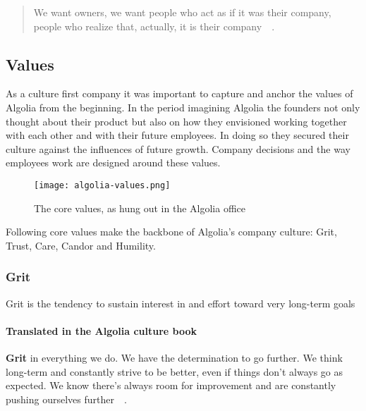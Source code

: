 \begin{quote}
We want owners, we want people who act as if it was their company, people who realize that, actually, it is their company~\cite{culture-first}~.
\end{quote}

\subsection{Values}
\label{sub:values}

As a culture first company it was important to capture and anchor the values of Algolia from the beginning. In the period imagining Algolia the founders not only thought about their product but also on how they envisioned working together with each other and with their future employees. In doing so they secured their culture against the influences of future growth. Company decisions and the way employees work are designed around these values.

\begin{figure}[H]
  \centering
  \texttt{[image: algolia-values.png]}
  \caption{The core values, as hung out in the Algolia office\cite{culture-first}}
  \label{figure:values}
\end{figure}

Following core values make the backbone of Algolia's company culture: Grit, Trust, Care, Candor and Humility. 

\subsubsection{Grit}
\label{ssub:grit}

\begin{definition}
Grit is the tendency to sustain interest in and effort toward very long-term goals\cite{grit-ducks}
\end{definition}


\paragraph{Translated in the Algolia culture book}

\textbf{Grit} in everything we do. We have the determination to go further. We think long-term and constantly strive to be better, even if things don’t always go as expected. We know there's always room for improvement and are constantly pushing ourselves further~\cite{algolia-careers}~.

